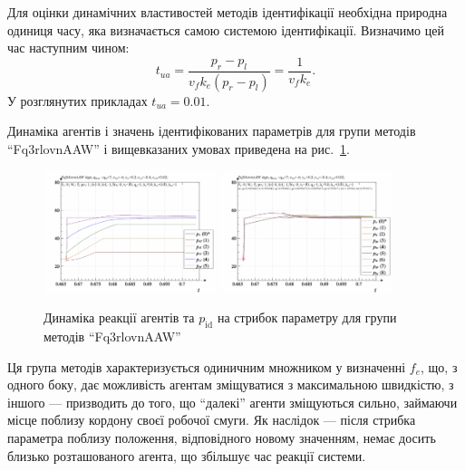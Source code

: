\documentclass[a4paper,13pt]{atuaref}
\begin{document}
Для оцінки динамічних властивостей методів ідентифікації необхідна природна
одиниця часу, яка визначається самою системою ідентифікації.
Визначимо цей час  наступним чином:
%
\begin{equation}
  t_{ua} = \frac{p_r - p_l}{ v_f k_e (p_r - p_l)} = \frac{1}{v_f k_e}.
  \label{atu:eq:t_ua}
\end{equation}
%
У розглянутих прикладах $t_{ua} = 0.01$.

Динаміка агентів і значень ідентифікованих параметрів для групи методів
``Fq3rlovnAAW'' і вищевказаних умовах приведена на рис.~\ref{atu:f:Fq3rlovnAAW_sign}.

\begin{figure}[htb!]
  \centerline{
    \includegraphics[width=0.45\textwidth]{p3/p/sign/qls-p_t_pi_m_Fq3rlovnAAW_sign.png}
    \hfill
    \includegraphics[width=0.45\textwidth]{p3/p/sign/qls-p_t_p_m_Fq3rlovnAAW_sign.png}
  }
  \caption{Динаміка реакції агентів та $p_\mathrm{id}$ на стрибок параметру для групи методів ``Fq3rlovnAAW''}
  \label{atu:f:Fq3rlovnAAW_sign}
\end{figure}

Ця група методів характеризується одиничним множником у визначенні $ f_e $, що,
з одного боку, дає можливість агентам зміщуватися з максимальною швидкістю, з
іншого --- призводить до того, що ``далекі'' агенти зміщуються сильно,
займаючи місце поблизу кордону своєї робочої смуги. Як наслідок --- після
стрибка параметра поблизу положення, відповідного новому значенням, немає
досить близько розташованого агента, що збільшує час реакції системи.
\end{document}
